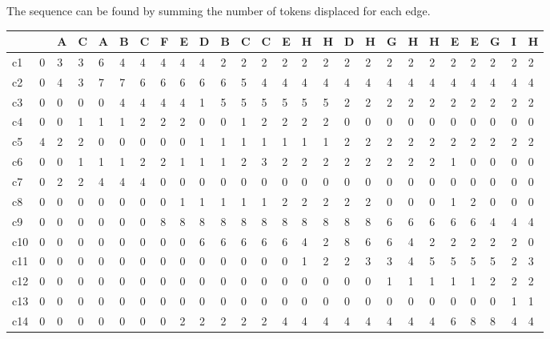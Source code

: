 \documentclass{article}
\begin{document}
The sequence can be found by summing the number of tokens displaced for each edge.
\begin{table}[H]
  \centering \tiny

  \begin{tabular}{|l|lllllllllllllllllllllllll|}
    \hline
~  & ~ & A & C & A & B & C & F & E & D & B & C & C & E & H & H & D & H & G & H & H & E & E & G & I & H \\ \hline
c1  & 0 & 3 & 3 & 6 & 4 & 4 & 4 & 4 & 4 & 2 & 2 & 2 & 2 & 2 & 2 & 2 & 2 & 2 & 2 & 2 & 2 & 2 & 2 & 2 & 2 \\
c2  & 0 & 4 & 3 & 7 & 7 & 6 & 6 & 6 & 6 & 6 & 5 & 4 & 4 & 4 & 4 & 4 & 4 & 4 & 4 & 4 & 4 & 4 & 4 & 4 & 4 \\
c3  & 0 & 0 & 0 & 0 & 4 & 4 & 4 & 4 & 1 & 5 & 5 & 5 & 5 & 5 & 5 & 2 & 2 & 2 & 2 & 2 & 2 & 2 & 2 & 2 & 2 \\
c4  & 0 & 0 & 1 & 1 & 1 & 2 & 2 & 2 & 0 & 0 & 1 & 2 & 2 & 2 & 2 & 0 & 0 & 0 & 0 & 0 & 0 & 0 & 0 & 0 & 0 \\
c5  & 4 & 2 & 2 & 0 & 0 & 0 & 0 & 0 & 1 & 1 & 1 & 1 & 1 & 1 & 1 & 2 & 2 & 2 & 2 & 2 & 2 & 2 & 2 & 2 & 2 \\
c6  & 0 & 0 & 1 & 1 & 1 & 2 & 2 & 1 & 1 & 1 & 2 & 3 & 2 & 2 & 2 & 2 & 2 & 2 & 2 & 2 & 1 & 0 & 0 & 0 & 0 \\
c7  & 0 & 2 & 2 & 4 & 4 & 4 & 0 & 0 & 0 & 0 & 0 & 0 & 0 & 0 & 0 & 0 & 0 & 0 & 0 & 0 & 0 & 0 & 0 & 0 & 0 \\
c8  & 0 & 0 & 0 & 0 & 0 & 0 & 0 & 1 & 1 & 1 & 1 & 1 & 2 & 2 & 2 & 2 & 2 & 0 & 0 & 0 & 1 & 2 & 0 & 0 & 0 \\
c9  & 0 & 0 & 0 & 0 & 0 & 0 & 8 & 8 & 8 & 8 & 8 & 8 & 8 & 8 & 8 & 8 & 8 & 6 & 6 & 6 & 6 & 6 & 4 & 4 & 4 \\
c10 & 0 & 0 & 0 & 0 & 0 & 0 & 0 & 0 & 6 & 6 & 6 & 6 & 6 & 4 & 2 & 8 & 6 & 6 & 4 & 2 & 2 & 2 & 2 & 2 & 0 \\
c11 & 0 & 0 & 0 & 0 & 0 & 0 & 0 & 0 & 0 & 0 & 0 & 0 & 0 & 1 & 2 & 2 & 3 & 3 & 4 & 5 & 5 & 5 & 5 & 2 & 3 \\
c12 & 0 & 0 & 0 & 0 & 0 & 0 & 0 & 0 & 0 & 0 & 0 & 0 & 0 & 0 & 0 & 0 & 0 & 1 & 1 & 1 & 1 & 1 & 2 & 2 & 2 \\
c13 & 0 & 0 & 0 & 0 & 0 & 0 & 0 & 0 & 0 & 0 & 0 & 0 & 0 & 0 & 0 & 0 & 0 & 0 & 0 & 0 & 0 & 0 & 0 & 1 & 1 \\
c14 & 0 & 0 & 0 & 0 & 0 & 0 & 0 & 2 & 2 & 2 & 2 & 2 & 4 & 4 & 4 & 4 & 4 & 4 & 4 & 4 & 6 & 8 & 8 & 4 & 4 \\ \hline 
\end{tabular}
  \begin{tabular}{|l|llllllllllllllllllllllllll|}

\end{tabular}
\end{table}
\end{document}
